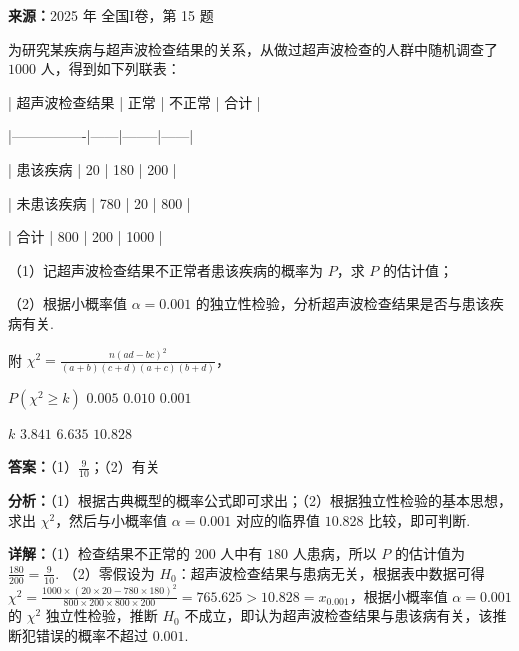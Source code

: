 \begin{question}[points=15]
\textbf{来源：}2025 年 全国I卷，第 15 题\par
为研究某疾病与超声波检查结果的关系，从做过超声波检查的人群中随机调查了 $1000$ 人，得到如下列联表：



| 超声波检查结果 | 正常 | 不正常 | 合计 |

|----------------|------|--------|------|

| 患该疾病 | 20 | 180 | 200 |

| 未患该疾病 | 780 | 20 | 800 |

| 合计 | 800 | 200 | 1000 |



（1）记超声波检查结果不正常者患该疾病的概率为 $P$，求 $P$ 的估计值；



（2）根据小概率值 $\alpha = 0.001$ 的独立性检验，分析超声波检查结果是否与患该疾病有关.



附 $\chi^2 = \frac{n(ad-bc)^2}{(a+b)(c+d)(a+c)(b+d)}$，



$P(\chi^2 \ge k)$ $0.005$ $0.010$ $0.001$



$k$ $3.841$ $6.635$ $10.828$
\begin{solution}
\textbf{答案：}（1）$\frac{9}{10}$；（2）有关

\textbf{分析：}（1）根据古典概型的概率公式即可求出；（2）根据独立性检验的基本思想，求出 $\chi^2$，然后与小概率值 $\alpha=0.001$ 对应的临界值 $10.828$ 比较，即可判断.

\textbf{详解：}（1）检查结果不正常的 $200$ 人中有 $180$ 人患病，所以 $P$ 的估计值为 $\frac{180}{200} = \frac{9}{10}$.
（2）零假设为 $H_0$：超声波检查结果与患病无关，根据表中数据可得 $\chi^2 = \frac{1000 \times (20\times20 - 780\times180)^2}{800\times200\times800\times200} = 765.625 > 10.828 = x_{0.001}$，根据小概率值 $\alpha=0.001$ 的 $\chi^2$ 独立性检验，推断 $H_0$ 不成立，即认为超声波检查结果与患该病有关，该推断犯错误的概率不超过 $0.001$.
\end{solution}
\end{question}

